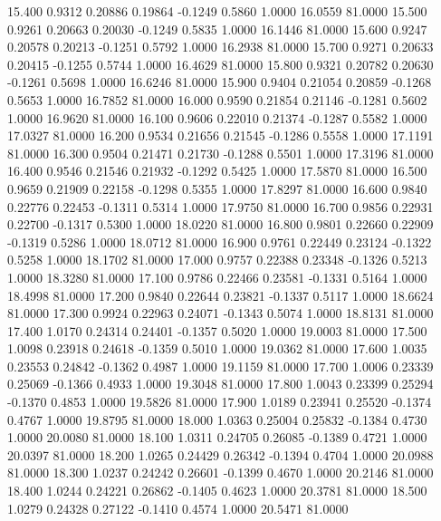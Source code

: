   15.400   0.9312   0.20886   0.19864  -0.1249   0.5860   1.0000  16.0559  81.0000
  15.500   0.9261   0.20663   0.20030  -0.1249   0.5835   1.0000  16.1446  81.0000
  15.600   0.9247   0.20578   0.20213  -0.1251   0.5792   1.0000  16.2938  81.0000
  15.700   0.9271   0.20633   0.20415  -0.1255   0.5744   1.0000  16.4629  81.0000
  15.800   0.9321   0.20782   0.20630  -0.1261   0.5698   1.0000  16.6246  81.0000
  15.900   0.9404   0.21054   0.20859  -0.1268   0.5653   1.0000  16.7852  81.0000
  16.000   0.9590   0.21854   0.21146  -0.1281   0.5602   1.0000  16.9620  81.0000
  16.100   0.9606   0.22010   0.21374  -0.1287   0.5582   1.0000  17.0327  81.0000
  16.200   0.9534   0.21656   0.21545  -0.1286   0.5558   1.0000  17.1191  81.0000
  16.300   0.9504   0.21471   0.21730  -0.1288   0.5501   1.0000  17.3196  81.0000
  16.400   0.9546   0.21546   0.21932  -0.1292   0.5425   1.0000  17.5870  81.0000
  16.500   0.9659   0.21909   0.22158  -0.1298   0.5355   1.0000  17.8297  81.0000
  16.600   0.9840   0.22776   0.22453  -0.1311   0.5314   1.0000  17.9750  81.0000
  16.700   0.9856   0.22931   0.22700  -0.1317   0.5300   1.0000  18.0220  81.0000
  16.800   0.9801   0.22660   0.22909  -0.1319   0.5286   1.0000  18.0712  81.0000
  16.900   0.9761   0.22449   0.23124  -0.1322   0.5258   1.0000  18.1702  81.0000
  17.000   0.9757   0.22388   0.23348  -0.1326   0.5213   1.0000  18.3280  81.0000
  17.100   0.9786   0.22466   0.23581  -0.1331   0.5164   1.0000  18.4998  81.0000
  17.200   0.9840   0.22644   0.23821  -0.1337   0.5117   1.0000  18.6624  81.0000
  17.300   0.9924   0.22963   0.24071  -0.1343   0.5074   1.0000  18.8131  81.0000
  17.400   1.0170   0.24314   0.24401  -0.1357   0.5020   1.0000  19.0003  81.0000
  17.500   1.0098   0.23918   0.24618  -0.1359   0.5010   1.0000  19.0362  81.0000
  17.600   1.0035   0.23553   0.24842  -0.1362   0.4987   1.0000  19.1159  81.0000
  17.700   1.0006   0.23339   0.25069  -0.1366   0.4933   1.0000  19.3048  81.0000
  17.800   1.0043   0.23399   0.25294  -0.1370   0.4853   1.0000  19.5826  81.0000
  17.900   1.0189   0.23941   0.25520  -0.1374   0.4767   1.0000  19.8795  81.0000
  18.000   1.0363   0.25004   0.25832  -0.1384   0.4730   1.0000  20.0080  81.0000
  18.100   1.0311   0.24705   0.26085  -0.1389   0.4721   1.0000  20.0397  81.0000
  18.200   1.0265   0.24429   0.26342  -0.1394   0.4704   1.0000  20.0988  81.0000
  18.300   1.0237   0.24242   0.26601  -0.1399   0.4670   1.0000  20.2146  81.0000
  18.400   1.0244   0.24221   0.26862  -0.1405   0.4623   1.0000  20.3781  81.0000
  18.500   1.0279   0.24328   0.27122  -0.1410   0.4574   1.0000  20.5471  81.0000
